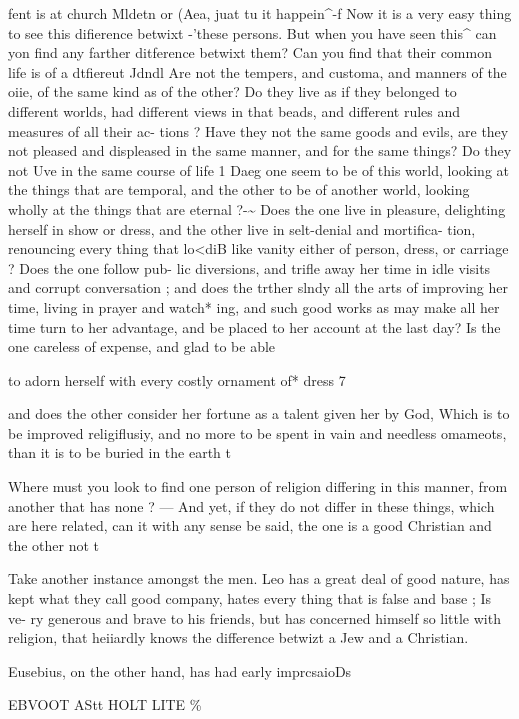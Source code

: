 \documentclass[
]{book}
\begin{document}
fent is at church Mldetn or (Aea, juat tu it happein\^{}-f Now it is a very easy thing to see this difierence betwixt -'these persons. But when you have seen this\^{} can yon find any farther ditference betwixt them? Can you find that their common life is of a dtfiereut Jdndl Are not the tempers, and customa, and manners of the oiie, of the same kind as of the other? Do they live as if they belonged to different worlds, had different views in that beads, and different rules and measures of all their ac- tions ? Have they not the same goods and evils, are they not pleased and displeased in the same manner, and for the same things? Do they not Uve in the same course of life 1 Daeg one seem to be of this world, looking at the things that are temporal, and the other to be of another world, looking wholly at the things that are eternal ?-\textasciitilde{} Does the one live in pleasure, delighting herself in show or dress, and the other live in selt-denial and mortifica- tion, renouncing every thing that lo\textless diB like vanity either of person, dress, or carriage ? Does the one follow pub- lic diversions, and trifle away her time in idle visits and corrupt conversation ; and does the trther slndy all the arts of improving her time, living in prayer and watch* ing, and such good works as may make all her time turn to her advantage, and be placed to her account at the last day? Is the one careless of expense, and glad to be able

to adorn herself with every costly ornament of* dress 7

and does the other consider her fortune as a talent given her by God, Which is to be improved religiflusiy, and no more to be spent in vain and needless omameots, than it is to be buried in the earth t

Where must you look to find one person of religion differing in this manner, from another that has none ? --- And yet, if they do not differ in these things, which are here related, can it with any sense be said, the one is a good Christian and the other not t

Take another instance amongst the men. Leo has a great deal of good nature, has kept what they call good company, hates every thing that is false and base ; Is ve- ry generous and brave to his friends, but has concerned himself so little with religion, that heiiardly knows the difference betwizt a Jew and a Christian.

Eusebius, on the other hand, has had early imprcsaioDs

EBVOOT AStt HOLT LITE \%
\end{document}
